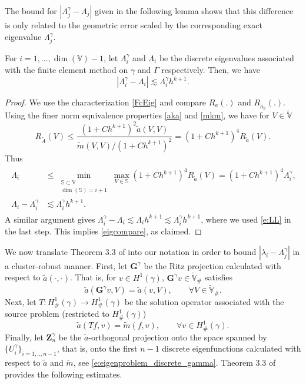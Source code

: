 \documentclass{siamart0516}
\newcommand{\ak}{\tilde{a}_h}
\newcommand{\bG}{\ensuremath{\boldsymbol G}}
\newcommand{\bZ}{\ensuremath{\boldsymbol Z}}
\numberwithin{equation}{section}
\numberwithin{theorem}{section}
\numberwithin{figure}{section}
\begin{document}
The bound for $|\Lambda^\gamma_{j} - \Lambda_{j}|$ given in the following lemma shows that this difference is  only related to the geometric error  scaled by  the corresponding exact eigenvalue $\Lambda^\gamma_j$.
\begin{lemma}
\label{eig_compare}
For $i=1,...,\dim(\mathbb V)-1$, let $\Lambda^\gamma_{i}$ and $\Lambda_{i}$ be the discrete eigenvalues associated with the finite element method on $\gamma$ and $\Gamma$ respectively.
 Then, we have
\begin{equation}\label{eigcompare}
|\Lambda^\gamma_{i} - \Lambda_{i}| \lesssim \Lambda^\gamma_{i}h^{k+1}.
\end{equation}
\end{lemma}	
\begin{proof}
We use the characterization \eqref{FcEig} and compare $R_a(.)$ and $R_{\ak}(.)$.
Using the finer norm equivalence properties \eqref{aka} and \eqref{mkm}, we have for $V\in \widetilde{\mathbb V}$
$$
R_{\widetilde A}(V) \leq \frac{(1+Ch^{k+1})^2 \tilde a(V,V)}{\tilde m(V,V)/(1+Ch^{k+1})^2} = (1+Ch^{k+1})^4R_{\tilde a}(V).
$$
Thus
\begin{align}
\begin{aligned}\label{e:LL}
\Lambda_{i} & \leq  \min_{\substack{\mathbb S\subset \mathbb V \\ \dim(\mathbb S)=i+1}} \max_{V\in \mathbb S} (1+Ch^{k+1})^4R_{\tilde a}(V)
=(1+Ch^{k+1})^4\Lambda^\gamma_{i},
\\ \Lambda_{i} -\Lambda^\gamma_{i} &  \lesssim \Lambda^\gamma_{i}h^{k+1}.
\end{aligned}
\end{align}
A similar argument gives $\Lambda_{i}^\gamma -\Lambda_{i}\lesssim \Lambda_i h^{k+1} \lesssim \Lambda_i^\gamma h^{k+1}$, where we used \eqref{e:LL} in the last step.
This implies \eqref{eigcompare}, as claimed.  
\end{proof}

We now translate Theorem 3.3 of \cite{KO06} into our notation in order to bound $|\lambda_i-\Lambda^\gamma_{j}|$ in a cluster-robust manner.  First, let ${\bG}^\gamma$ be the Ritz projection calculated with respect to $\tilde a(\cdot, \cdot)$.  That is, for $v\in H^1(\gamma)$,  ${\bG}^\gamma v \in \widetilde{\mathbb{V}}_\#$ satisfies 
$$
\tilde a(\bG^\gamma v, V) = \tilde a(v, V), \qquad \forall V \in \widetilde{\mathbb{V}}_\#.
$$  
Next, let $T: H^1_\#(\gamma) \rightarrow H^1_\#(\gamma)$ be the solution operator associated with the source problem (restricted to $H^1_\#(\gamma)$)
$$
\tilde a(Tf, v) =\tilde m(f,v), \qquad \forall v \in H^1_\#(\gamma).
$$
Finally, let $\bZ^\gamma_n$ be the $\tilde a$-orthogonal projection onto the space spanned by\\
 $\{ U^\gamma_i\}_{i=1,.., n-1}$, that is, onto the first $n-1$ discrete eigenfunctions calculated with respect to $\tilde a$ and $\tilde m$, see \eqref{e:eigenproblem_discrete_gamma}.  Theorem 3.3 of \cite{KO06} provides the following estimates.  
\end{document}
